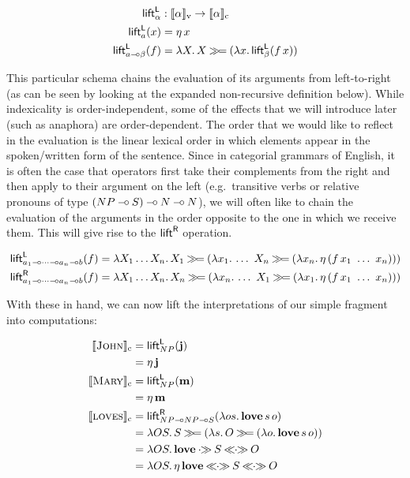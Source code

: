 \begin{align*}
  \textsf{lift}^{\textsf{L}}_\alpha &: \llbracket \alpha \rrbracket_{\mathrm{v}} \to \llbracket \alpha \rrbracket_{\mathrm{c}} \\
  \textsf{lift}^{\textsf{L}}_a(x) &= \eta\,x \\
  \textsf{lift}^{\textsf{L}}_{a \mathbin{{-}\mkern-3.5mu{\circ}} \beta}(f) &= \lambda X.\, X \mathbin{\gg\!=} (\lambda x.\, \textsf{lift}^{\textsf{L}}_\beta(f\,x))
\end{align*}

This particular schema chains the evaluation of its arguments from
left-to-right (as can be seen by looking at the expanded non-recursive
definition below). While indexicality is order-independent, some of the
effects that we will introduce later (such as anaphora) are
order-dependent. The order that we would like to reflect in the evaluation
is the linear lexical order in which elements appear in the spoken/written
form of the sentence. Since in categorial grammars of English, it is often
the case that operators first take their complements from the right and
then apply to their argument on the left (e.g.\ transitive verbs or
relative pronouns of type $(NP \mathbin{{-}\mkern-3.5mu{\circ}} S) \mathbin{{-}\mkern-3.5mu{\circ}} N \mathbin{{-}\mkern-3.5mu{\circ}} N$), we will often
like to chain the evaluation of the arguments in the order opposite to the
one in which we receive them. This will give rise to the $\textsf{lift}^{\textsf{R}}$
operation.

\begin{align*}
  \liftl_{a_1 \limp \cdots \limp a_n \limp b}(f) &= \lam{X_1 \ldots X_n}{X_1 \hsbind (\lam{x_1}{\ldots\ X_n \hsbind (\lam{x_n}{\etaE{(\ap{f}{x_1\ \ldots\ x_n})}})})} \\
  \liftr_{a_1 \limp \cdots \limp a_n \limp b}(f) &= \lam{X_1 \ldots X_n}{X_n \hsbind (\lam{x_n}{\ldots\ X_1 \hsbind (\lam{x_1}{\etaE{(\ap{f}{x_1\ \ldots\ x_n})}})})} \\
\end{align*}

With these in hand, we can now lift the interpretations of our simple
fragment into computations:

\begin{align*}
\sem{\abs{John}}_\petitc &= \liftl_{NP}(\obj{j}) \\
&= \etaE{\obj{j}} \\
\sem{\abs{Mary}}_\petitc &= \liftl_{NP}(\obj{m}) \\
&= \etaE{\obj{m}} \\
\sem{\abs{loves}}_\petitc &= \liftr_{NP \limp NP \limp S}(\lam{o s}{\app{\obj{love}}{s}{o}}) \\
&= \lam{O S}{S \hsbind (\lam{s}{O \hsbind (\lam{o}{\app{\obj{love}}{s}{o}})})} \\
&= \lam{O S}{\obj{love} \apr S \aplr O} \\
&= \lam{O S}{\etaE{\obj{love}} \aplr S \aplr O}
\end{align*}

